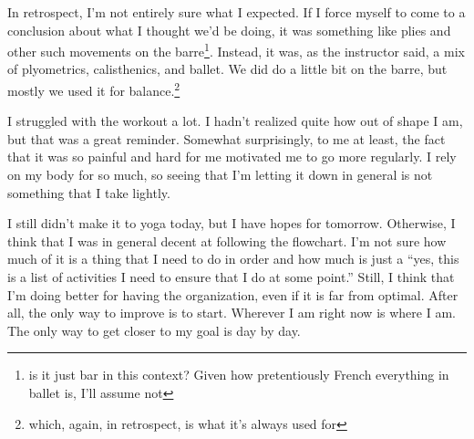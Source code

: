 \documentclass[12pt]{article}[titlepage]
\newcommand{\say}[1]{``#1''}
\renewcommand{\,}{\textsuperscript{,}}
\begin{document}
In retrospect, I'm not entirely sure what I expected.  
If I force myself to come to a conclusion about what I thought we'd be doing, it was something like plies and other such movements on the barre\footnote{is it just bar in this context? Given how pretentiously French everything in ballet is, I'll assume not}.  
Instead, it was, as the instructor said, a mix of plyometrics, calisthenics, and ballet.  
We did do a little bit on the barre, but mostly we used it for balance.\footnote{which, again, in retrospect, is what it's always used for}

I struggled with the workout a lot.  
I hadn't realized quite how out of shape I am, but that was a great reminder.  
Somewhat surprisingly, to me at least, the fact that it was so painful and hard for me motivated me to go more regularly.  
I rely on my body for so much, so seeing that I'm letting it down in general is not something that I take lightly.

I still didn't make it to yoga today, but I have hopes for tomorrow.  
Otherwise, I think that I was in general decent at following the flowchart.  
I'm not sure how much of it is a thing that I need to do in order and how much is just a \say{yes, this is a list of activities I need to ensure that I do at some point.}  
Still, I think that I'm doing better for having the organization, even if it is far from optimal.  
After all, the only way to improve is to start.  
Wherever I am right now is where I am.  
The only way to get closer to my goal is day by day.  
\end{document}
